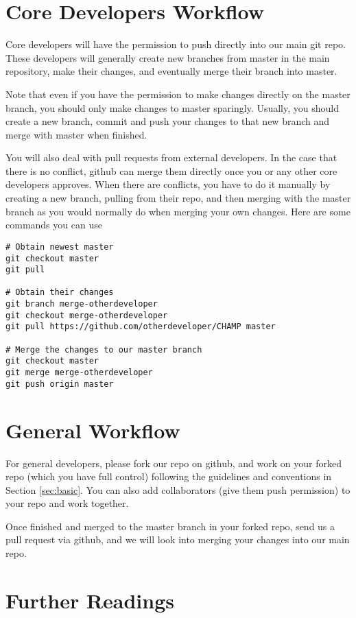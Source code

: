 \documentclass[runningheads,letterpaper]{llncs}
\begin{document}
\section{Core Developers Workflow}

Core developers will have the permission to push directly into our main git repo. These 
developers will generally create new branches from master in the main repository, make their
changes, and eventually merge their branch into master.

Note that even if you have the permission to make changes directly on the master branch, you 
should only make changes to master sparingly.
Usually, you should create a new branch, commit and push your changes to that new branch 
and merge with master when finished.

You will also deal with pull requests from external developers.
In the case that there is no conflict, github can merge them directly once you or any other core developers approves.
When there are conflicts, you have to do it manually by creating a new branch, pulling from their repo, and then merging with the master branch as you would normally do when merging your own changes.
Here are some commands you can use
\begin{verbatim}
# Obtain newest master
git checkout master
git pull

# Obtain their changes
git branch merge-otherdeveloper
git checkout merge-otherdeveloper
git pull https://github.com/otherdeveloper/CHAMP master

# Merge the changes to our master branch
git checkout master
git merge merge-otherdeveloper
git push origin master
\end{verbatim}

\section{General Workflow}

For general developers, please fork our repo on github, and work on your forked repo (which you have full control) following the guidelines and conventions in Section \ref{sec:basic}.
You can also add collaborators (give them push permission) to your repo and work together.

Once finished and merged to the master branch in your forked repo, send us a pull request via github, and we will look into merging your changes into our main repo.


\section{Further Readings}
\end{document}
